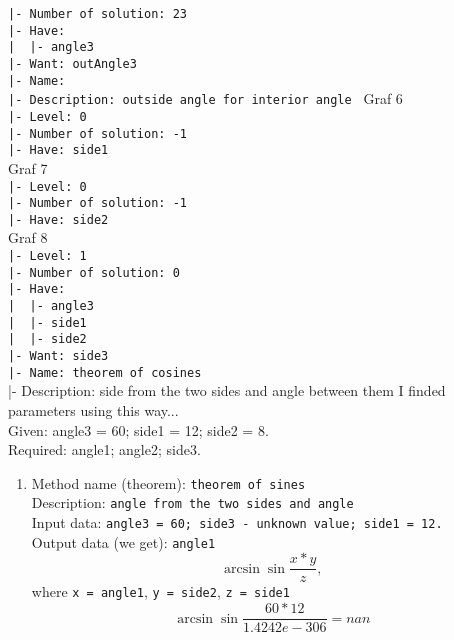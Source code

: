 \documentclass[12pt,a4paper]{article}
\begin{document}
\verb'|- Number of solution: 23'\\
\verb'|- Have: '\\
\verb'|  |- angle3 '\\
\verb'|- Want: outAngle3 '\\
\verb'|- Name:  '\\
\verb'|- Description: outside angle for interior angle '
Graf 6\\
\verb'|- Level: 0'\\
\verb'|- Number of solution: -1'\\
\verb'|- Have: side1'\\
Graf 7\\
\verb'|- Level: 0'\\
\verb'|- Number of solution: -1'\\
\verb'|- Have: side2'\\
Graf 8\\
\verb'|- Level: 1'\\
\verb'|- Number of solution: 0'\\
\verb'|- Have: '\\
\verb'|  |- angle3 '\\
\verb'|  |- side1 '\\
\verb'|  |- side2 '\\
\verb'|- Want: side3 '\\
\verb'|- Name: theorem of cosines '\\
|- Description: side from the two sides and angle between them
\newpage
I finded parameters using this way...\\
Given: angle3 = 60; side1 = 12; side2 = 8. \\
Required: angle1; angle2; side3.
\flushleft
\begin{enumerate}
\item
Method name (theorem): \verb'theorem of sines'\\
Description: \verb'angle from the two sides and angle'\\
Input data: \verb'angle3 = 60; side3 - unknown value; side1 = 12.' \\
Output data (we get): \verb'angle1'
\begin{displaymath} \arcsin{\sin{\frac{x*y}{z}}},\end{displaymath}where \verb'x = angle1', \verb'y = side2', \verb'z = side1' \begin{displaymath}\arcsin{\sin{\frac{60*12}{1.4242e-306}}}=nan \end{displaymath}
\end{enumerate}
\end{document}
